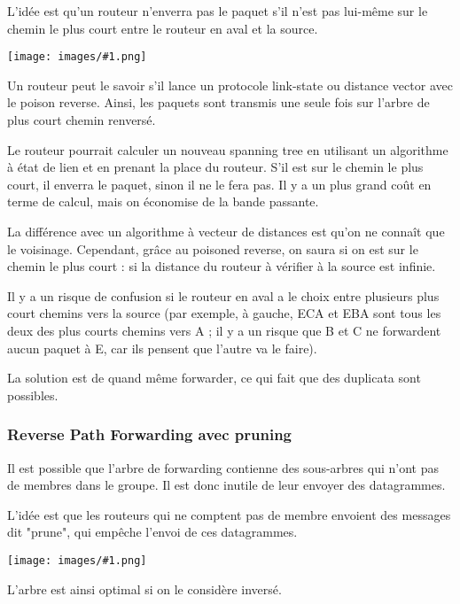 \documentclass[10pt,a4paper]{report}
\newcommand{\dessin}[1]{\begin{center}\texttt{[image: images/\#1.png]}\end{center}}
\begin{document}
			
			L'idée est qu'un routeur n'enverra pas le paquet s'il n'est pas lui-même sur le chemin le plus court entre le routeur en aval et la source.
		
		
			\dessin{134}		
		
			Un routeur peut le savoir s'il lance un protocole link-state ou distance vector avec le poison reverse. Ainsi, les paquets sont transmis une seule fois sur l'arbre de plus court chemin renversé.
			
			Le routeur pourrait calculer un nouveau spanning tree en utilisant un algorithme à état de lien et en prenant la place du routeur. S'il est sur le chemin le plus court, il enverra le paquet, sinon il ne le fera pas. Il y a un plus grand coût en terme de calcul, mais on économise de la bande passante.
				 
			La différence avec un algorithme à vecteur de distances est qu'on ne connaît que le voisinage. Cependant, grâce au poisoned reverse, on saura si on est sur le chemin le plus court : si la distance du routeur à vérifier à la source est infinie.
		
			Il y a un risque de confusion si le routeur en aval a le choix entre plusieurs plus court chemins vers la source (par exemple, à gauche, ECA et EBA sont tous les deux des plus courts chemins vers A ; il y a un risque que B et C ne forwardent aucun paquet à E, car ils pensent que l'autre va le faire).
			
			La solution est de quand même forwarder, ce qui fait que des duplicata sont possibles.
				
			\subsubsection{Reverse Path Forwarding avec pruning}
			
			Il est possible que l'arbre de forwarding contienne des sous-arbres qui n'ont pas de membres dans le groupe. Il est donc inutile de leur envoyer des datagrammes.
			
			L'idée est que les routeurs qui ne comptent pas de membre envoient des messages dit "prune", qui empêche l'envoi de ces datagrammes.
			
			\dessin{135}
					
			L'arbre est ainsi optimal si on le considère inversé.
		
\end{document}
